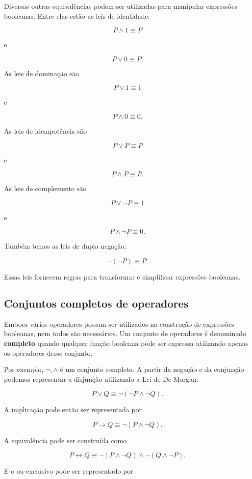 \documentclass[
  brazilian,
  letterpaper,
]{book}
\theoremstyle{plain}
\theoremstyle{definition}
\theoremstyle{remark}
\begin{document}
Diversas outras equivalências podem ser utilizadas para manipular
expressões booleanas. Entre elas estão as leis de identidade:

\[
P\wedge1\equiv P
\]

e

\[
P\vee0\equiv P.
\]

As leis de dominação são

\[
P\vee1\equiv1
\]

e

\[
P\wedge0\equiv0.
\]

As leis de idempotência são

\[
P\vee P\equiv P
\]

e

\[
P\wedge P\equiv P.
\]

As leis de complemento são

\[
P\vee\neg P\equiv1
\]

e

\[
P\wedge\neg P\equiv0.
\]

Também temos as leis de dupla negação:

\[
\neg(\neg P)\equiv P.
\]

Essas leis fornecem regras para transformar e simplificar expressões
booleanas.

\subsection{Conjuntos completos de
operadores}\label{conjuntos-completos-de-operadores}

Embora vários operadores possam ser utilizados na construção de
expressões booleanas, nem todos são necessários. Um conjunto de
operadores é denominado \textbf{completo} quando qualquer função
booleana pode ser expressa utilizando apenas os operadores desse
conjunto.

Por exemplo, \({\neg,\wedge}\) é um conjunto completo. A partir da
negação e da conjunção podemos representar a disjunção utilizando a Lei
de De Morgan:

\[
P\vee Q
\equiv
\neg(\neg P\wedge\neg Q).
\]

A implicação pode então ser representada por

\[
P\rightarrow Q
\equiv
\neg(P\wedge\neg Q).
\]

A equivalência pode ser construída como

\[
P\leftrightarrow Q
\equiv
\neg(P\wedge\neg Q)
\wedge
\neg(Q\wedge\neg P).
\]

E o ou-exclusivo pode ser representado por
\end{document}
